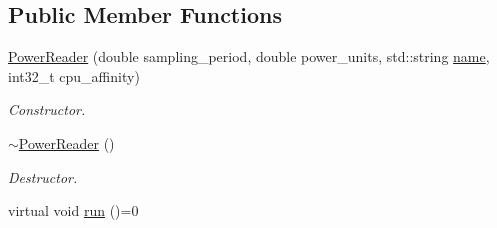 \subsection*{Public Member Functions}
\begin{DoxyCompactItemize}
\item 
\hyperlink{classxmem_1_1power_1_1_power_reader_abae158275e32689c1c69a90b8962959b}{Power\-Reader} (double sampling\-\_\-period, double power\-\_\-units, std\-::string \hyperlink{classxmem_1_1power_1_1_power_reader_ac0f465b044512502eb1824f18d60e3e6}{name}, int32\-\_\-t cpu\-\_\-affinity)
\begin{DoxyCompactList}\small\item\em Constructor. \end{DoxyCompactList}\item 
\hypertarget{classxmem_1_1power_1_1_power_reader_ae3c8c415135bfa4b3ba150c2d9b931a3}{\hyperlink{classxmem_1_1power_1_1_power_reader_ae3c8c415135bfa4b3ba150c2d9b931a3}{$\sim$\-Power\-Reader} ()}\label{classxmem_1_1power_1_1_power_reader_ae3c8c415135bfa4b3ba150c2d9b931a3}

\begin{DoxyCompactList}\small\item\em Destructor. \end{DoxyCompactList}\item 
\hypertarget{classxmem_1_1power_1_1_power_reader_ad8286b3727efbcb0ff5049c6594d126a}{virtual void \hyperlink{classxmem_1_1power_1_1_power_reader_ad8286b3727efbcb0ff5049c6594d126a}{run} ()=0}\label{classxmem_1_1power_1_1_power_reader_ad8286b3727efbcb0ff5049c6594d126a}


\end{DoxyCompactItemize}
